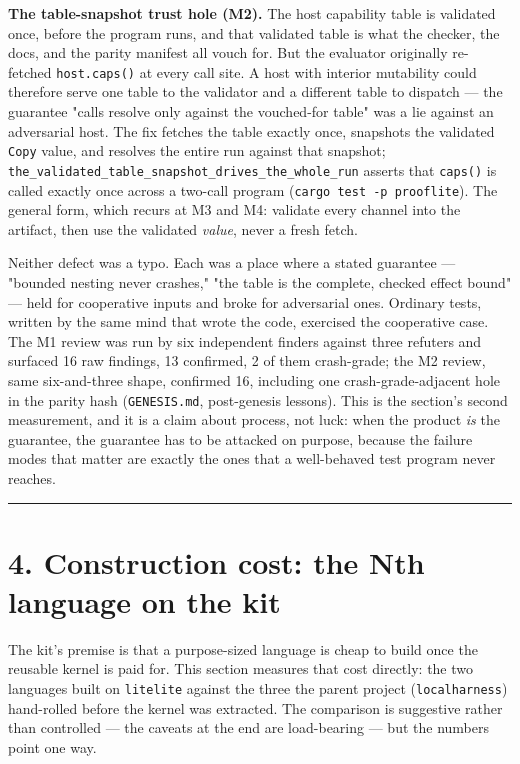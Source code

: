 \documentclass[11pt]{article}
\newcommand{\code}[1]{\texttt{#1}}
\begin{document}
\textbf{The table-snapshot trust hole (M2).} The host capability table is validated
once, before the program runs, and that validated table is what the checker,
the docs, and the parity manifest all vouch for. But the evaluator originally
re-fetched \code{host.caps()} at every call site. A host with interior mutability
could therefore serve one table to the validator and a different table to
dispatch --- the guarantee "calls resolve only against the vouched-for table" was
a lie against an adversarial host. The fix fetches the table exactly once,
snapshots the validated \code{Copy} value, and resolves the entire run against that
snapshot; \code{the\_validated\_table\_snapshot\_drives\_the\_whole\_run} asserts that
\code{caps()} is called exactly once across a two-call program
(\code{cargo test -p prooflite}). The general form, which recurs at M3 and M4:
validate every channel into the artifact, then use the validated \emph{value}, never
a fresh fetch.

Neither defect was a typo. Each was a place where a stated guarantee --- "bounded
nesting never crashes," "the table is the complete, checked effect bound" --- held
for cooperative inputs and broke for adversarial ones. Ordinary tests, written
by the same mind that wrote the code, exercised the cooperative case. The M1
review was run by six independent finders against three refuters and surfaced 16
raw findings, 13 confirmed, 2 of them crash-grade; the M2 review, same
six-and-three shape, confirmed 16, including one crash-grade-adjacent hole in
the parity hash (\code{GENESIS.md}, post-genesis lessons). This is the section's
second measurement, and it is a claim about process, not luck: when the product
\emph{is} the guarantee, the guarantee has to be attacked on purpose, because the
failure modes that matter are exactly the ones that a well-behaved test program
never reaches.

\bigskip\hrule\bigskip

\section*{4. Construction cost: the Nth language on the kit}

The kit's premise is that a purpose-sized language is cheap to build once the
reusable kernel is paid for. This section measures that cost directly: the two
languages built on \code{litelite} against the three the parent project
(\code{localharness}) hand-rolled before the kernel was extracted. The comparison is
suggestive rather than controlled --- the caveats at the end are load-bearing ---
but the numbers point one way.
\end{document}
